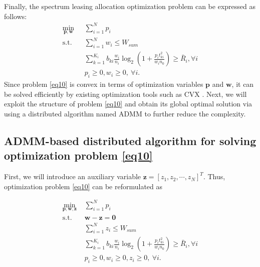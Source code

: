 \documentclass[journal]{IEEEtran}
\begin{document}
Finally, the spectrum leasing allocation optimization problem can be expressed as follows:
\begin{subequations}\label{eq10}
	\begin{align}
	\min_{\mathbf{p}, \mathbf{w}}\ & \sum\limits_{i = 1}^{N} p_i \label{q10a} \\ \mbox{s.t.} \quad &  \sum\limits_{i = 1}^{N} w_i \leq W_{sum} \label{q10b} \\ \quad &  \sum\limits_{k = 1}^{K_i}b_{ki}\frac{w_i}{n_i}\log_2\left(1 + \frac{p_it_{ki}^2}{w_in_0}\right) \geq \bar{R}_i, \forall i \label{q10c}\\
	& p_i \geq 0, w_i \geq 0, \ \forall i. \label{q10d}
	\end{align}
\end{subequations}
Since problem \eqref{eq10} is convex in terms of optimization variables $\mathbf{p}$ and $\mathbf{w}$, it can be solved efficiently by existing optimization tools such as CVX \cite{SBoyd1}. Next, we will exploit the structure of problem \eqref{eq10} and obtain its global optimal solution via using a distributed algorithm named ADMM \cite{SBoyd2,EChen} to further reduce the complexity.
\subsection{ADMM-based distributed algorithm for solving optimization problem \eqref{eq10}}
First, we will introduce an auxiliary variable $\mathbf{z} = \left[z_1, z_2, \cdots, z_N\right]^T$. Thus, optimization problem \eqref{eq10} can be reformulated as

\begin{subequations}\label{eq11}
	\begin{align}
	\min_{\mathbf{p}, \mathbf{w}, \mathbf{z}}\ & \sum\limits_{i = 1}^{N} p_i \label{q11a} \\ \mbox{s.t.} \quad &  \mathbf{w} - \mathbf{z} = \mathbf{0} \label{q11b} \\ \quad &  \sum\limits_{i = 1}^{N}z_i \leq W_{sum} \label{q11c} \\ \quad &  \sum\limits_{k = 1}^{K_i}b_{ki}\frac{w_i}{n_i}\log_2\left(1 + \frac{p_it_{ki}^2}{w_in_0}\right) \geq \bar{R}_i, \forall i \label{q11d}\\
	& p_i \geq 0, w_i \geq 0, z_i \geq 0, \ \forall i. \label{q11e}
	\end{align}
\end{subequations}
\end{document}
